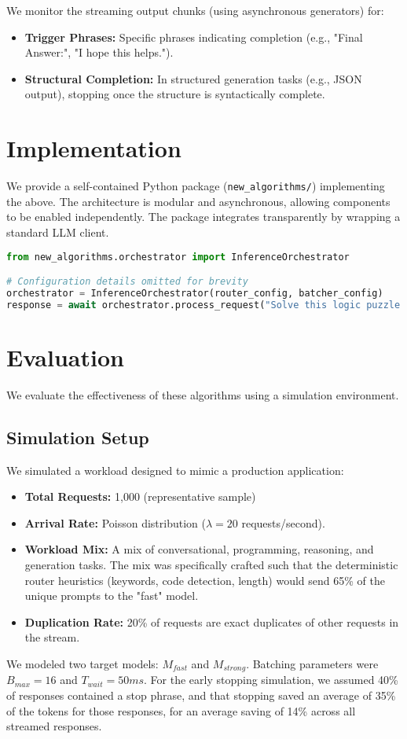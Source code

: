 \documentclass[11pt]{article}
\begin{document}
We monitor the streaming output chunks (using asynchronous generators) for:
\begin{itemize}
    \item \textbf{Trigger Phrases:} Specific phrases indicating completion (e.g., "Final Answer:", "I hope this helps.").
    \item \textbf{Structural Completion:} In structured generation tasks (e.g., JSON output), stopping once the structure is syntactically complete.
\end{itemize}

\section{Implementation}
We provide a self-contained Python package (\texttt{new\_algorithms/}) implementing the above. The architecture is modular and asynchronous, allowing components to be enabled independently. The package integrates transparently by wrapping a standard LLM client.

\begin{lstlisting}[language=Python, caption=Example usage of the integrated orchestrator]
from new_algorithms.orchestrator import InferenceOrchestrator

# Configuration details omitted for brevity
orchestrator = InferenceOrchestrator(router_config, batcher_config)
response = await orchestrator.process_request("Solve this logic puzzle...", params)
\end{lstlisting}

\section{Evaluation}
We evaluate the effectiveness of these algorithms using a simulation environment.

\subsection{Simulation Setup}
We simulated a workload designed to mimic a production application:
\begin{itemize}
    \item \textbf{Total Requests:} 1,000 (representative sample)
    \item \textbf{Arrival Rate:} Poisson distribution ($\lambda=20$ requests/second).
    \item \textbf{Workload Mix:} A mix of conversational, programming, reasoning, and generation tasks. The mix was specifically crafted such that the deterministic router heuristics (keywords, code detection, length) would send 65\% of the unique prompts to the "fast" model.
    \item \textbf{Duplication Rate:} 20\% of requests are exact duplicates of other requests in the stream.
\end{itemize}
We modeled two target models: $M_{fast}$ and $M_{strong}$. Batching parameters were $B_{max}=16$ and $T_{wait}=50ms$. For the early stopping simulation, we assumed 40\% of responses contained a stop phrase, and that stopping saved an average of 35\% of the tokens for those responses, for an average saving of 14\% across all streamed responses.
\end{document}
